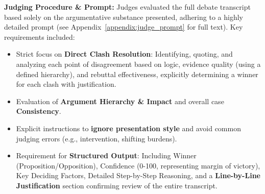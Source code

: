 \documentclass{article}
\begin{document}
\textbf{Judging Procedure \& Prompt:} Judges evaluated the full debate transcript based solely on the argumentative substance presented, adhering to a highly detailed prompt (see Appendix~\ref{appendix:judge_prompt} for full text). Key requirements included:
\begin{itemize}
    \item Strict focus on \textbf{Direct Clash Resolution}: Identifying, quoting, and analyzing each point of disagreement based on logic, evidence quality (using a defined hierarchy), and rebuttal effectiveness, explicitly determining a winner for each clash with justification.
    \item Evaluation of \textbf{Argument Hierarchy \& Impact} and overall case \textbf{Consistency}.
    \item Explicit instructions to \textbf{ignore presentation style} and avoid common judging errors (e.g., intervention, shifting burdens).
    \item Requirement for \textbf{Structured Output}: Including Winner (Proposition/Opposition), Confidence (0-100, representing margin of victory), Key Deciding Factors, Detailed Step-by-Step Reasoning, and a \textbf{Line-by-Line Justification} section confirming review of the entire transcript.
\end{itemize}
\end{document}
